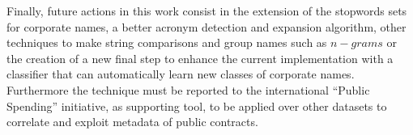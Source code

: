 \documentclass{llncs}
\begin{document}
Finally, future actions in this work consist in the extension of the stopwords sets 
for corporate names, a better acronym detection and expansion algorithm, other techniques to 
make string comparisons and group names such as $n-grams$ or the creation of a new final step to enhance 
the current implementation with a classifier that can automatically learn new classes of corporate names. 
Furthermore the technique must be reported to the international ``Public Spending'' initiative, as supporting tool, 
to be applied over other datasets to correlate and exploit metadata of public contracts.




\end{document}
